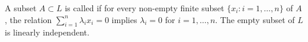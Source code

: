 A subset $A \subset L$ is called  if for every non-empty finite subset $\{x_i : i = 1, \ldots, n\}$ of $A$, the relation $\sum_{i=1}^{n} \lambda_i x_i = 0$ implies $\lambda_i = 0$ for $i = 1, \ldots, n$. The empty subset of $L$ is linearly independent.
